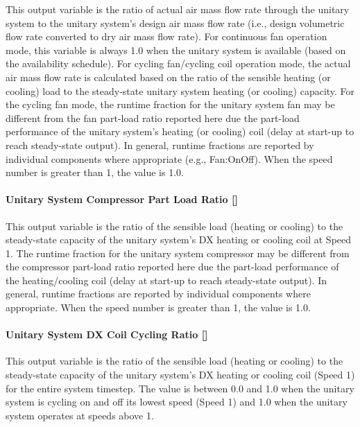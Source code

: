 This output variable is the ratio of actual air mass flow rate through the unitary system to the unitary system's design air mass flow rate (i.e., design volumetric flow rate converted to dry air mass flow rate). For continuous fan operation mode, this variable is always 1.0 when the unitary system is available (based on the availability schedule). For cycling fan/cycling coil operation mode, the actual air mass flow rate is calculated based on the ratio of the sensible heating (or cooling) load to the steady-state unitary system heating (or cooling) capacity. For the cycling fan mode, the runtime fraction for the unitary system fan may be different from the fan part-load ratio reported here due the part-load performance of the unitary system's heating (or cooling) coil (delay at start-up to reach steady-state output). In general, runtime fractions are reported by individual components where appropriate (e.g., Fan:OnOff). When the speed number is greater than 1, the value is 1.0.

\paragraph{Unitary System Compressor Part Load Ratio {[]}}\label{unitary-system-compressor-part-load-ratio}

This output variable is the ratio of the sensible load (heating or cooling) to the steady-state capacity of the unitary system's DX heating or cooling coil at Speed 1. The runtime fraction for the unitary system compressor may be different from the compressor part-load ratio reported here due the part-load performance of the heating/cooling coil (delay at start-up to reach steady-state output). In general, runtime fractions are reported by individual components where appropriate. When the speed number is greater than 1, the value is 1.0.

\paragraph{Unitary System DX Coil Cycling Ratio {[]}}\label{unitary-system-dx-coil-cycling-ratio}

This output variable is the ratio of the sensible load (heating or cooling) to the steady-state capacity of the unitary system's DX heating or cooling coil (Speed 1) for the entire system timestep. The value is between 0.0 and 1.0 when the unitary system is cycling on and off its lowest speed (Speed 1) and 1.0 when the unitary system operates at speeds above 1.

